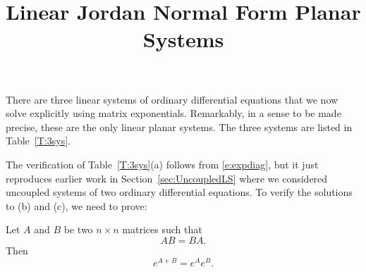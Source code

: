 \documentclass{ximera}
\title{Linear Jordan Normal Form Planar Systems}
\begin{document}
\begin{abstract}
\end{abstract}
\maketitle

\label{S:LNFPS}

There are three linear systems of ordinary differential equations
that we now solve explicitly using matrix exponentials.  Remarkably,
in a sense to be made precise, these are the only linear planar systems.
The three systems are listed in Table~\ref{T:3sys}.



The verification of Table~\ref{T:3sys}(a) follows from \eqref{e:expdiag}, but
it just reproduces earlier work in Section~\ref{sec:UncoupledLS} where we
considered uncoupled systems of two ordinary differential equations.
To verify the solutions to (b) and (c), we need to prove:

\begin{proposition}  \label{P:expAB}
Let $A$ and $B$ be two $n\times n$ matrices such that
\begin{equation} \label{e:AB=BA}
AB = BA.
\end{equation}
Then
\[
e^{A+B} = e^A e^B.
\]
\end{proposition} 
\end{document}
